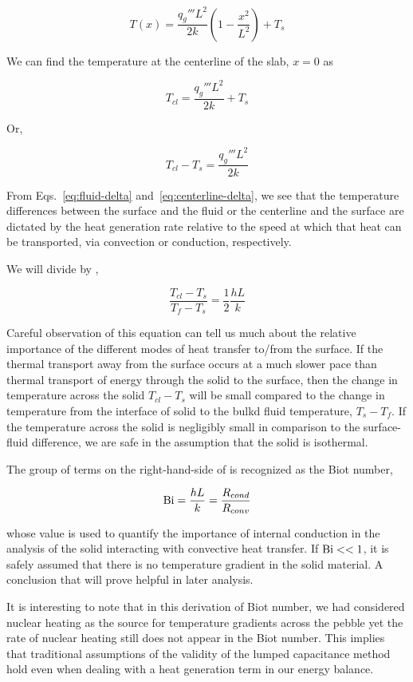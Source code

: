 \begin{equation}
	T(x) = \frac{q_g''' L^2}{2k}\left(1-\frac{x^2}{L^2}\right) + T_s
\end{equation}

We can find the temperature at the centerline of the slab, $x = 0$ as

\begin{equation}
	T_{cl} = \frac{q_g''' L^2}{2k} + T_s
\end{equation}

Or,

\begin{equation}\label{eq:centerline-delta}
	T_{cl} - T_s = \frac{q_g''' L^2}{2k}
\end{equation}

From Eqs.~\ref{eq:fluid-delta} and~\ref{eq:centerline-delta}, we see that the temperature differences between the surface and the fluid or the centerline and the surface are dictated by the heat generation rate relative to the speed at which that heat can be transported, via convection or conduction, respectively.

We will divide  by ,

\begin{equation}\label{eq:biot-derivation}
	\frac{T_{cl} - T_s}{T_f-T_s} = \frac{1}{2}\frac{hL}{k}
\end{equation}

Careful observation of this equation can tell us much about the relative importance of the different modes of heat transfer to/from the surface. If the thermal transport away from the surface occurs at a much slower pace than thermal transport of energy through the solid to the surface, then the change in temperature across the solid $T_{cl}-T_{s}$ will be small compared to the change in temperature from the interface of solid to the bulkd fluid temperature, $T_{s}-T_f$. If the temperature across the solid is negligibly small in comparison to the surface-fluid difference, we are safe in the assumption that the solid is isothermal.

The group of terms on the right-hand-side of  is recognized as the Biot number,

\begin{equation}\label{eq:biot-number}
	\mathrm{Bi}=\frac{hL}{k}=\frac{R_{cond}}{R_{conv}}
\end{equation}

whose value is used to quantify the importance of internal conduction in the analysis of the solid interacting with convective heat transfer. If $\mathrm{Bi}<<1$, it is safely assumed that there is no temperature gradient in the solid material. A conclusion that will prove helpful in later analysis.

It is interesting to note that in this derivation of Biot number, we had considered nuclear heating as the source for temperature gradients across the pebble yet the rate of nuclear heating still does not appear in the Biot number. This implies that traditional assumptions of the validity of the lumped capacitance method hold even when dealing with a heat generation term in our energy balance.

